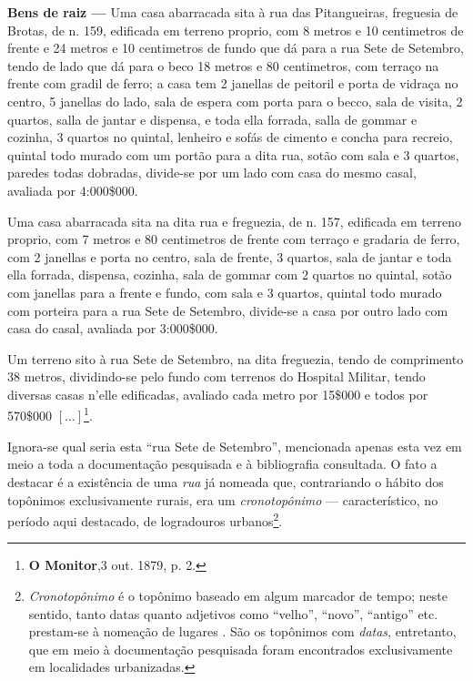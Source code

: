 \begin{citacao}
\textbf{Bens de raiz --- }Uma casa abarracada sita à rua das Pitangueiras, freguesia de Brotas, de n. 159, edificada em terreno proprio, com 8 metros e 10 centimetros de frente e 24 metros e 10 centimetros de fundo que dá para a rua Sete de Setembro, tendo de lado que dá para o beco 18 metros e 80 centimetros, com terraço na frente com gradil de ferro; a casa tem 2 janellas de peitoril e porta de vidraça no centro, 5 janellas do lado, sala de espera com porta para o becco, sala de visita, 2 quartos, salla de jantar e dispensa, e toda ella forrada, salla de gommar e cozinha, 3 quartos no quintal, lenheiro e sofás de cimento e concha para recreio, quintal todo murado com um portão para a dita rua, sotão com sala e 3 quartos, paredes todas dobradas, divide-se por um lado com casa do mesmo casal, avaliada por 4:000\$000.

Uma casa abarracada sita na dita rua e freguezia, de n. 157, edificada em terreno proprio, com 7 metros e 80 centimetros de frente com terraço e gradaria de ferro, com 2 janellas e porta no centro, sala de frente, 3 quartos, sala de jantar e toda ella forrada, dispensa, cozinha, sala de gommar com 2 quartos no quintal, sotão com janellas para a frente e fundo, com sala e 3 quartos, quintal todo murado com porteira para a rua Sete de Setembro, divide-se a casa por outro lado com casa do casal, avaliada por 3:000\$000.

Um terreno sito à rua Sete de Setembro, na dita freguezia, tendo de comprimento 38 metros, dividindo-se pelo fundo com terrenos do Hospital Militar, tendo diversas casas n'elle edificadas, avaliado cada metro por 15\$000 e todos por 570\$000 \([\dots]\)\footnote{\textbf{O Monitor},3 out. 1879, p. 2.}.
\end{citacao}

Ignora-se qual seria esta ``rua Sete de Setembro'', mencionada apenas esta vez em meio a toda a documentação pesquisada e à bibliografia consultada. O fato a destacar é a existência de uma \textit{rua} já nomeada que, contrariando o hábito dos topônimos exclusivamente rurais, era um \textit{cronotopônimo} --- característico, no período aqui destacado, de logradouros urbanos\footnote{\textit{Cronotopônimo} é o topônimo baseado em algum marcador de tempo; neste sentido, tanto datas quanto adjetivos como ``velho'', ``novo'', ``antigo'' etc. prestam-se à nomeação de lugares \cite{dick_taxotopo_1975, silva_eletopon_2017}. São os topônimos com \textit{datas}, entretanto, que em meio à documentação pesquisada foram encontrados exclusivamente em localidades urbanizadas.}.

